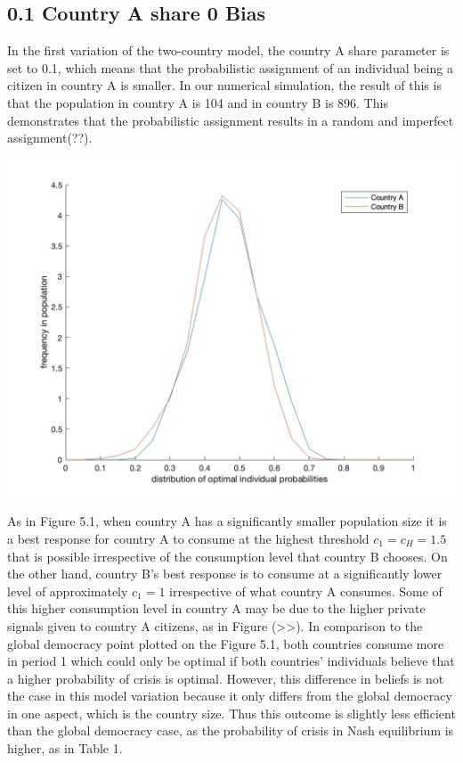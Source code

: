\documentclass[11pt,preprint, authoryear]{elsarticle}
\let\origfigure\figure
\let\endorigfigure\endfigure
\renewenvironment{figure}[1][2] {
    \expandafter\origfigure\expandafter[H]
} {
    \endorigfigure
}
\numberwithin{equation}{section}
\numberwithin{figure}{section}
\numberwithin{table}{section}
\begin{document}
\hypertarget{country-a-share-0-bias}{%
\subsection*{0.1 Country A share 0 Bias}\label{country-a-share-0-bias}}

In the first variation of the two-country model, the country A share
parameter is set to 0.1, which means that the probabilistic assignment
of an individual being a citizen in country A is smaller. In our
numerical simulation, the result of this is that the population in
country A is 104 and in country B is 896. This demonstrates that the
probabilistic assignment results in a random and imperfect
assignment(??).

\begin{figure}[H]

{\centering \includegraphics[width=0.8\linewidth]{images/Fig4_0.1Size0Bias} 

}

\caption{0.1 Country A share model: Kernel density function of the distribution of the optimal probabilty of crisis and frequency thereof across individuals in country A and country B}\label{fig:unnamed-chunk-5}
\end{figure}

As in Figure 5.1, when country A has a significantly smaller population
size it is a best response for country A to consume at the highest
threshold \(c_1=c_H=1.5\) that is possible irrespective of the
consumption level that country B chooses. On the other hand, country B's
best response is to consume at a significantly lower level of
approximately \(c_1=1\) irrespective of what country A consumes. Some of
this higher consumption level in country A may be due to the higher
private signals given to country A citizens, as in Figure
(\textgreater\textgreater). In comparison to the global democracy point
plotted on the Figure 5.1, both countries consume more in period 1 which
could only be optimal if both countries' individuals believe that a
higher probability of crisis is optimal. However, this difference in
beliefs is not the case in this model variation because it only differs
from the global democracy in one aspect, which is the country size. Thus
this outcome is slightly less efficient than the global democracy case,
as the probability of crisis in Nash equilibrium is higher, as in Table
1.
\end{document}
